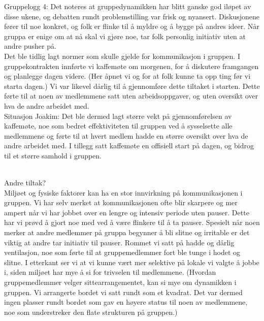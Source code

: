 Gruppelogg 4:
Det noteres at gruppedynamikken har blitt ganske god iløpet av disse ukene, og
debatten rundt problemstilling var frisk og nyansert. Diskusjonene fører til noe
konkret, og folk er flinke til å myldre og å bygge på andres ideer. Når gruppa
er enige om at nå skal vi gjøre noe, tar folk personlig initiativ uten at andre
pusher på.\\
Det ble tidlig lagt normer som skulle gjelde for kommunikasjon i gruppen. I gruppekontrakten innførte vi kaffemøte om morgenen, for å diskutere framgangen og planlegge dagen videre. (Her åpnet vi og for at folk kunne ta opp ting før vi starta dagen.) Vi var likevel dårlig til å gjennomføre dette tiltaket i starten. Dette førte til at noen av medlemmene satt uten arbeidsoppgaver, og uten oversikt over hva de andre arbeidet med. \\
Situasjon Joakim:
Det ble dermed lagt større vekt på gjennomførelsen av kaffemøte, noe som bedret effektiviteten til gruppen ved å sysselsette alle medlemmene og førte til at hvert medlem hadde en større oversikt over hva de andre arbeidet med. I tillegg satt kaffemøte en offisiell start på dagen, og bidrog til et større samhold i gruppen. \\\

Andre tiltak?\\

Miljøet og fysiske faktorer kan ha en stor innvirkning på kommunikasjonen i gruppen. Vi har selv merket at kommunikasjonen ofte blir skarpere og mer ampert når vi har jobbet over en lengre og intensiv periode uten pauser. Dette har vi prøvd å gjort noe med ved å være flinkere til å ta pauser. Spesielt når noen merker at andre medlemmer på gruppa begynner å bli slitne og irritable er det viktig at andre tar initiativ til pauser. Rommet vi satt på hadde og dårlig ventilasjon, noe som førte til at gruppemedlemmer fort ble tunge i hodet og slitne. I etterkant ser vi at vi kunne vært mer selektive på lokale vi valgte å jobbe i, siden miljøet har mye å si for trivselen til medlemmene.
(Hvordan gruppemedlemmer velger sittearrangementet, kan si mye om dynamikken i gruppen. Vi arrangerte bordet vi satt rundt som et kvadrat. Det var dermed ingen plasser rundt bordet som gav en høyere status til noen av medlemmene, noe som understreker den flate strukturen på gruppen.)\\

